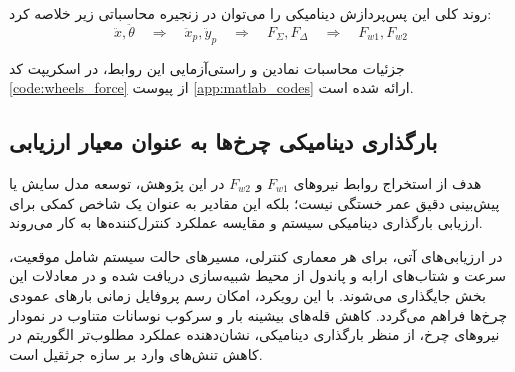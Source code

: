روند کلی این پس‌پردازش دینامیکی را می‌توان در زنجیره محاسباتی زیر خلاصه کرد:
\begin{equation*}
    \ddot{x}, \ddot{\theta} \quad \Rightarrow \quad \ddot{x}_p, \ddot{y}_p \quad \Rightarrow \quad F_\Sigma, F_\Delta \quad \Rightarrow \quad F_{w1}, F_{w2}
\end{equation*}

جزئیات محاسبات نمادین و راستی‌آزمایی این روابط، در اسکریپت کد \ref{code:wheels_force} از پیوست \ref{app:matlab_codes} ارائه شده است.

\subsection{بارگذاری دینامیکی چرخ‌ها به عنوان معیار ارزیابی}
هدف از استخراج روابط نیروهای $F_{w1}$ و $F_{w2}$ در این پژوهش، توسعه مدل سایش یا پیش‌بینی دقیق عمر خستگی نیست؛ بلکه این مقادیر به عنوان یک شاخص کمکی برای ارزیابی بارگذاری دینامیکی سیستم و مقایسه عملکرد کنترل‌کننده‌ها به کار می‌روند.

در ارزیابی‌های آتی، برای هر معماری کنترلی، مسیرهای حالت سیستم شامل موقعیت، سرعت و شتاب‌های ارابه و پاندول از محیط شبیه‌سازی دریافت شده و در معادلات این بخش جایگذاری می‌شوند. با این رویکرد، امکان رسم پروفایل زمانی بارهای عمودی چرخ‌ها فراهم می‌گردد. کاهش قله‌های بیشینه بار و سرکوب نوسانات متناوب در نمودار نیروهای چرخ، از منظر بارگذاری دینامیکی، نشان‌دهنده عملکرد مطلوب‌تر الگوریتم در کاهش تنش‌های وارد بر سازه جرثقیل است.